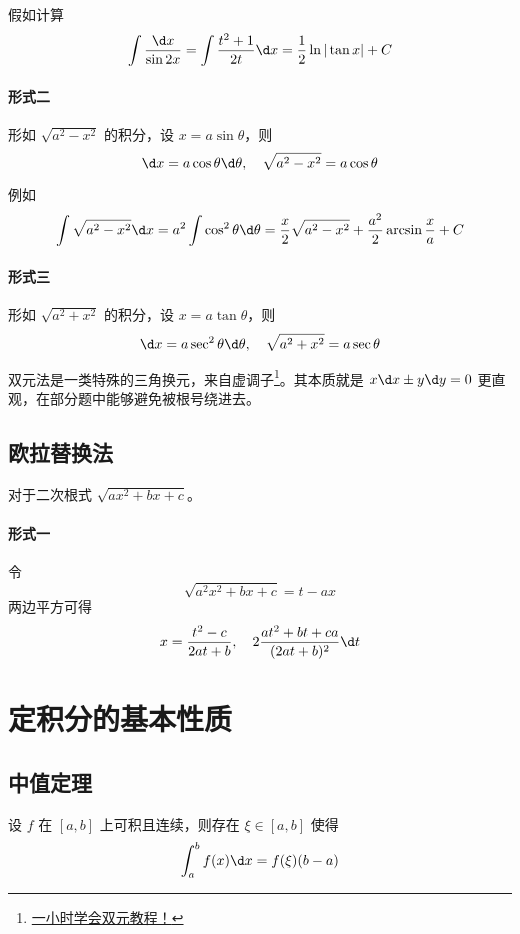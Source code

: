 假如计算
\[ \int \frac{\d x}{\sin 2x} = \int \frac{t^2+1}{2t} \d x = \frac{1}{2} \ln | \tan x| + C \]


\paragraph{形式二} 形如 $\sqrt{a^2 - x^2}$ 的积分，设 $x = a \sin \theta$，则
\[ \d x = a \cos \theta \d \theta, \quad \sqrt{a^2 - x^2} = a \cos \theta \]

例如
\[ \int \sqrt{a^2 - x^2} \d x = a^2 \int \cos^2 \theta \d \theta = \frac{x}{2}\sqrt{a^2 - x^2} + \frac{a^2}{2} \arcsin \frac{x}{a} + C \]

\paragraph{形式三} 形如 $\sqrt{a^2 + x^2}$ 的积分，设 $x = a \tan \theta$，则
\[ \d x = a \sec^2 \theta \d \theta, \quad \sqrt{a^2+x^2} = a \sec \theta \]

双元法是一类特殊的三角换元，来自虚调子\footnote{\href{https://zhuanlan.zhihu.com/p/443599480}{一小时学会双元教程！}}。其本质就是 $x\d x \pm y \d y = 0$ 更直观，在部分题中能够避免被根号绕进去。

\subsection{欧拉替换法}

对于二次根式 $\sqrt{a x^2 + b x + c}$。

\paragraph{形式一} 令
\[ \sqrt{a^2x^2+bx+c} = t - ax \]
两边平方可得
\[ x = \frac{t^2 - c}{2at + b}, \quad 2\frac{at^2 + bt + ca}{(2at+b)^2} \d t \]

\section{定积分的基本性质}

\subsection{中值定理}

\begin{theorem}[积分第一中值定理]
	设 $f$ 在 $[a,b]$ 上可积且连续，则存在 $\xi \in [a, b]$ 使得
	\[ \int_{a}^{b} f(x) \d x = f(\xi) (b-a) \]
\end{theorem}

